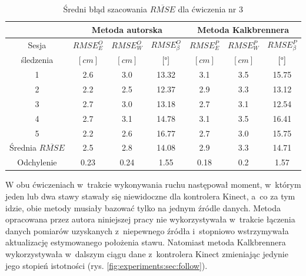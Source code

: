 \begin{table}[!htp]
	\caption{Średni błąd szacowania $\overline{RMSE}$ dla ćwiczenia nr 3}
	\label{tab:experiments:thr:avg}
	\noindent
	\tiny
	\centering
	\begin{tabular}{|c|c|c|c|c|c|c|}
		\hline 
		& \multicolumn{3}{c|}{Metoda autorska} & \multicolumn{3}{c|}{Metoda Kalkbrennera}  \\ 
		\hline 
		Sesja                      & $RMSE^O_E$ & $RMSE^O_W$ & $RMSE^O_\beta$ & $RMSE^P_E$ & $RMSE^P_W$ & $RMSE^P_\beta$ \\
		śledzenia                 & $[cm]$     & $[cm]$     & $[\degree]$    & $[cm]$     & $[cm]$     & $[\degree]$    \\	
		\hline
		1                          & 2.6        & 3.0        & 13.32          & 3.1        & 3.5        & 15.75          \\
		2                          & 2.2        & 2.5        & 12.37          & 2.9        & 3.3        & 13.12          \\
		3                          & 2.7        & 3.0        & 13.18          & 2.7        & 3.1        & 12.54          \\
		4                          & 2.7        & 3.1        & 14.78          & 3.1        & 3.5        & 16.41          \\
		5                          & 2.2        & 2.6        & 16.77          & 2.7        & 3.0        & 15.75          \\
		\hline
		Średnia $\overline{RMSE}$ & 2.5        & 2.8        & 14.08          & 2.9        & 3.3        & 14.71          \\
		Odchylenie                 & 0.23       & 0.24       & 1.55           & 0.18       & 0.2        & 1.57           \\
		\hline
	\end{tabular} 
								
\end{table} 

W obu ćwiczeniach w~trakcie wykonywania ruchu następował moment, w~którym jeden lub dwa stawy stawały się niewidoczne dla kontrolera Kinect, a~co za tym idzie, obie metody musiały bazować tylko na jednym źródle danych. Metoda opracowana przez autora niniejszej pracy nie wykorzystywała  w~trakcie łączenia danych pomiarów uzyskanych z~niepewnego źródła i~stopniowo wstrzymywała aktualizację estymowanego położenia stawu. Natomiast metoda Kalkbrennera wykorzystywała w~dalszym ciągu dane z~kontrolera Kinect zmieniając jedynie jego stopień istotności (rys. \ref{fig:experiments:sec:follow}). 

